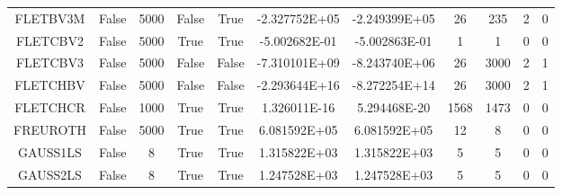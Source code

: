 \begin{longtable}{ccccccccccc}
	\cellcolor{default1} FLETBV3M& \cellcolor{default1} False& \cellcolor{default1} 5000& \cellcolor{default1} False& \cellcolor{default1} True& \cellcolor{best} -2.327752E+05& \cellcolor{poor} -2.249399E+05& \cellcolor{best} 26& \cellcolor{poor} 235& \cellcolor{default1} 2& \cellcolor{default1} 0\\
	\cellcolor{default2} FLETCBV2& \cellcolor{default2} False& \cellcolor{default2} 5000& \cellcolor{default2} True& \cellcolor{default2} True& \cellcolor{ok} -5.002682E-01& \cellcolor{best} -5.002863E-01& \cellcolor{best} 1& \cellcolor{best} 1& \cellcolor{default2} 0& \cellcolor{default2} 0\\
	\cellcolor{default1} FLETCBV3& \cellcolor{default1} False& \cellcolor{default1} 5000& \cellcolor{default1} False& \cellcolor{default1} False& \cellcolor{best} -7.310101E+09& \cellcolor{poor} -8.243740E+06& \cellcolor{best} 26& \cellcolor{poor} 3000& \cellcolor{default1} 2& \cellcolor{default1} 1\\
	\cellcolor{default2} FLETCHBV& \cellcolor{default2} False& \cellcolor{default2} 5000& \cellcolor{default2} False& \cellcolor{default2} False& \cellcolor{best} -2.293644E+16& \cellcolor{poor} -8.272254E+14& \cellcolor{best} 26& \cellcolor{poor} 3000& \cellcolor{default2} 2& \cellcolor{default2} 1\\
	\cellcolor{default1} FLETCHCR& \cellcolor{default1} False& \cellcolor{default1} 1000& \cellcolor{default1} True& \cellcolor{default1} True& \cellcolor{ok} 1.326011E-16& \cellcolor{best} 5.294468E-20& \cellcolor{ok} 1568& \cellcolor{best} 1473& \cellcolor{default1} 0& \cellcolor{default1} 0\\
	\cellcolor{default2} FREUROTH& \cellcolor{default2} False& \cellcolor{default2} 5000& \cellcolor{default2} True& \cellcolor{default2} True& \cellcolor{best} 6.081592E+05& \cellcolor{ok} 6.081592E+05& \cellcolor{ok} 12& \cellcolor{best} 8& \cellcolor{default2} 0& \cellcolor{default2} 0\\
	\cellcolor{default1} GAUSS1LS& \cellcolor{default1} False& \cellcolor{default1} 8& \cellcolor{default1} True& \cellcolor{default1} True& \cellcolor{ok} 1.315822E+03& \cellcolor{best} 1.315822E+03& \cellcolor{best} 5& \cellcolor{best} 5& \cellcolor{default1} 0& \cellcolor{default1} 0\\
	\cellcolor{default2} GAUSS2LS& \cellcolor{default2} False& \cellcolor{default2} 8& \cellcolor{default2} True& \cellcolor{default2} True& \cellcolor{ok} 1.247528E+03& \cellcolor{best} 1.247528E+03& \cellcolor{best} 5& \cellcolor{best} 5& \cellcolor{default2} 0& \cellcolor{default2} 0\\

\end{longtable}
